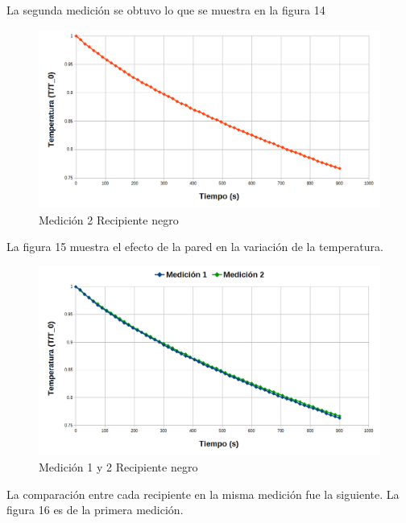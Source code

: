 \documentclass[12pt]{article}
\begin{document}
La segunda medición se obtuvo lo que se muestra en la figura 14
\begin{figure}[H]
\centering
\includegraphics[scale=0.4]{CN2.png}
\caption{Medición 2 Recipiente negro}
\end{figure}

La figura 15 muestra el efecto de la pared en la variación de la temperatura.
\begin{figure}[H]
\centering
\includegraphics[scale=0.4]{CN1_2.png}
\caption{Medición 1 y 2 Recipiente negro}
\end{figure}	

La comparación entre cada recipiente en la misma medición fue la siguiente. La figura 16 es de la primera medición.
\end{document}
